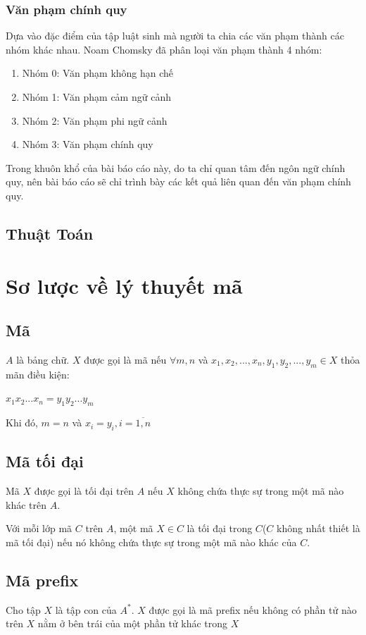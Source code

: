 \documentclass[14pt]{extreport}
\begin{document}
\subsection{Văn phạm chính quy}
Dựa vào đặc điểm của tập luật sinh mà người ta chia các văn phạm thành các nhóm khác nhau. Noam Chomsky đã phân loại văn phạm thành 4 nhóm:
\begin{enumerate}
\item Nhóm 0: Văn phạm không hạn chế
\item Nhóm 1: Văn phạm cảm ngữ cảnh
\item Nhóm 2: Văn phạm phi ngữ cảnh
\item Nhóm 3: Văn phạm chính quy
\end{enumerate}

Trong khuôn khổ của bài báo cáo này, do ta chỉ quan tâm đến ngôn ngữ chính quy, nên bài báo cáo sẽ chỉ trình bày các kết quả liên quan đến văn phạm  chính quy.

\section{Thuật Toán}

\chapter{Sơ lược về lý thuyết mã}
\section{Mã}
$A$ là bảng chữ. $X$ được gọi là mã nếu $\forall m,n$ và $x_1,x_2,...,x_n,y_1,y_2,...,y_m \in X$ thỏa mãn điều kiện:
\begin{center}
$x_1x_2...x_n=y_1y_2...y_m$
\end{center}
Khi đó, $m=n$ và $x_i=y_i,i=\overline{1,n}$
\section{Mã tối đại}
Mã $X$ được gọi là tối đại trên $A$ nếu $X$ không chứa thực sự trong một mã nào khác trên $A$.

Với mỗi lớp mã $C$ trên $A$, một mã $X\in C$ là tối đại trong $C$($C$ không nhất thiết là mã tối đại) nếu nó không chứa thực sự trong một mã nào khác của $C$.
\section{Mã prefix}
	Cho tập $X$ là tập con của $A^*$. $X$ được gọi là mã prefix nếu không có phần tử nào trên $X$ nằm ở bên trái của một phần tử khác trong $X$
\end{document}
